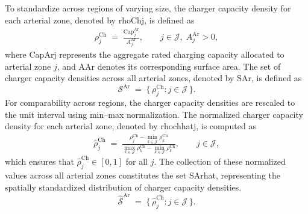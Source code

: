 To standardize across regions of varying size, the charger capacity density for each arterial zone, denoted by \gls{rhoChj}, is defined as
\begin{align}
  \label{eq:Charger_capacity_density}
  \rho^{\mathrm{Ch}}_{j}
  \;=\;
  \frac{\mathrm{Cap}^{\mathrm{Ar}}_{j}}{A^{\mathrm{Ar}}_{j}},
  \qquad j \in \mathcal{J}, \; A^{\mathrm{Ar}}_{j}>0,
\end{align}
where \gls{CapArj} represents the aggregate rated charging capacity allocated to arterial zone $j$, and \gls{AAr} denotes its corresponding surface area. The set of charger capacity densities across all arterial zones, denoted by \gls{SAr}, is defined as
\begin{equation}
  \label{eq:Charger_capacity_density_set}
  \mathcal{S}^{\mathrm{Ar}}
   \;=\;
   \bigl\{\, 
      \rho^{\mathrm{Ch}}_{j} 
      : j \in \mathcal{J} 
   \,\bigr\}.
\end{equation}
For comparability across regions, the charger capacity densities are rescaled to the unit interval using min--max normalization. The normalized charger capacity density for each arterial zone, denoted by \gls{rhochhatj}, is computed as
\begin{align}
  \label{eq:Charger_capacity_density_norm}
  \widehat{\rho}^{\mathrm{Ch}}_{j}
   \;=\;
   \frac{\rho^{\mathrm{Ch}}_{j} - \min_{k \in \mathcal{J}} \rho^{\mathrm{Ch}}_{k}}
        {\max_{k \in \mathcal{J}} \rho^{\mathrm{Ch}}_{k} - \min_{k \in \mathcal{J}} \rho^{\mathrm{Ch}}_{k}},
   \qquad j \in \mathcal{J},
\end{align}
which ensures that $\widehat{\rho}^{\mathrm{Ch}}_{j} \in [0,1]$ for all $j$. The collection of these normalized values across all arterial zones constitutes the set \gls{SArhat}, representing the spatially standardized distribution of charger capacity densities.
\begin{equation}
  \label{eq:Charger_capacity_density_norm_set}
  \widehat{\mathcal{S}}^{\mathrm{Ar}}
   \;=\;
   \bigl\{\, 
      \widehat{\rho}^{\mathrm{Ch}}_{j} 
      : j \in \mathcal{J} 
   \,\bigr\}.
\end{equation}


